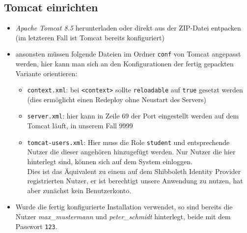\subsection{Tomcat einrichten}
\begin{itemize}
	\item \textit{Apache Tomcat 8.5} herunterladen oder direkt aus der ZIP-Datei entpacken (im letzteren Fall ist Tomcat bereits konfiguriert)
	\item ansonsten müssen folgende Dateien im Ordner \texttt{conf} von Tomcat angepasst werden, hier kann man sich an den Konfigurationen der fertig gepackten Variante orientieren:
	\begin{itemize}
		\item \texttt{context.xml}: bei \texttt{<context>} sollte \texttt{reloadable} auf \texttt{true} gesetzt werden (dies ermöglicht einen Redeploy ohne Neustart des Servers)
		\item   \texttt{server.xml}: hier kann in Zeile 69 der Port eingestellt werden auf dem Tomcat läuft, in unserem Fall 9999
		\item \texttt{tomcat-users.xml}: Hier muss die Role \texttt{student} und entsprechende Nutzer die dieser angehören hinzugefügt werden. Nur Nutzer die hier hinterlegt sind, können sich auf dem System einloggen. \\
		Dies ist das Äquivalent zu einem auf dem Shibboleth Identity Provider registrierten Nutzer, er ist berechtigt unsere Anwendung zu nutzen, hat aber zunächst kein Benutzerkonto.
	\end{itemize}
	\item Wurde die fertig konfigurierte Installation verwendet, so sind bereits die Nutzer \textit{max\_mustermann} und \textit{peter\_schmidt} hinterlegt, beide mit dem Passwort \texttt{123}.
\end{itemize}
